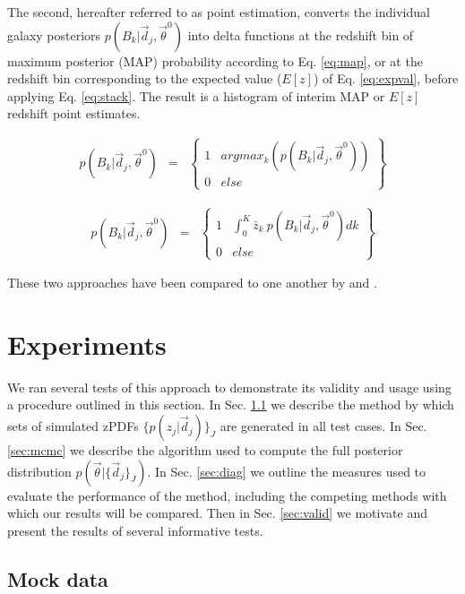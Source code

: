 \documentclass[preprint]{aastex}
\begin{document}
The second, hereafter referred to as point estimation, converts the individual 
galaxy posteriors $p(B_{k}|\vec{d}_{j},\vec{\theta}^{0})$ into delta functions 
at the redshift bin of maximum posterior (MAP) probability according to Eq. 
\ref{eq:map}, or at the redshift bin corresponding to the expected value 
($E[z]$) of Eq. \ref{eq:expval}, before applying Eq. \ref{eq:stack}.  The 
result is a histogram of interim MAP or $E[z]$ redshift point estimates.

\begin{eqnarray}
\label{eq:map}
p(B_{k}|\vec{d}_{j},\vec{\theta}^{0}) &=& 
\left\{\begin{array}{cc}1&argmax_{k}(p(B_{k}|\vec{d}_{j},\vec{\theta}^{0}))\\0&e
lse\end{array}\right\}
\end{eqnarray}

\begin{eqnarray}
\label{eq:expval}
p(B_{k}|\vec{d}_{j},\vec{\theta}^{0}) &=& 
\left\{\begin{array}{cc}1&\int_{0}^{K} \bar{z}_{k}\ 
p(B_{k}|\vec{d}_{j},\vec{\theta}^{0}) dk\\0&else\end{array}\right\}
\end{eqnarray}

These two approaches have been compared to one another by \citet{hil11} and 
\citet{ben12}.

\clearpage
\section{Experiments}
\label{sec:exp}

We ran several tests of this approach to demonstrate its validity and usage 
using a procedure outlined in this section.  In Sec. \ref{sec:mock} we describe 
the method by which sets of simulated zPDFs $\{p(z_{j}|\vec{d}_{j})\}_{J}$ are 
generated in all test cases.  In Sec. \ref{sec:mcmc} we describe the algorithm 
used to compute the full posterior distribution 
$p(\vec{\theta}|\{\vec{d}_{j}\}_{J})$.  In Sec. \ref{sec:diag} we outline the 
measures used to evaluate the performance of the method, including the 
competing methods with which our results will be compared.  Then in Sec. 
\ref{sec:valid} we motivate and present the results of several informative 
tests.

\clearpage
\subsection{Mock data}
\label{sec:mock}
\end{document}
